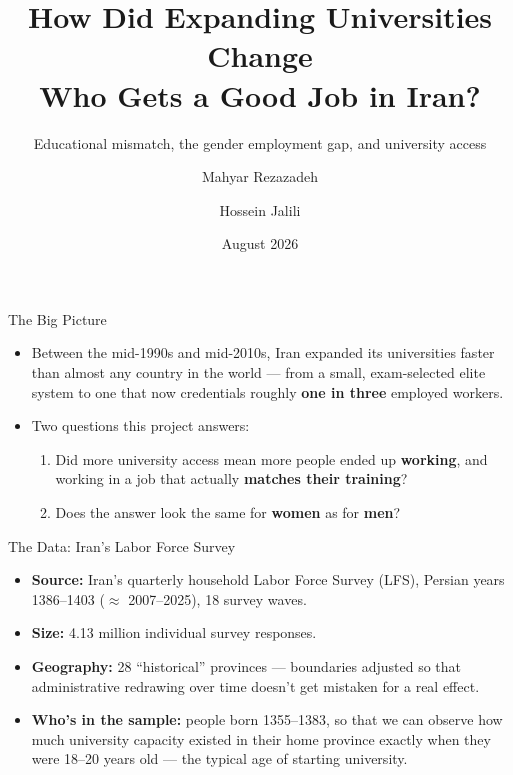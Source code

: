 \documentclass[aspectratio=169,11pt]{beamer}
\title{How Did Expanding Universities Change\\ Who Gets a Good Job in Iran?}
\subtitle{Educational mismatch, the gender employment gap, and university access}
\author{Mahyar Rezazadeh \and Hossein Jalili}
\date{August 2026}
\begin{document}
\begin{frame}
\titlepage
\end{frame}

\begin{frame}[c]{The Big Picture}
\begin{itemize}
\item Between the mid-1990s and mid-2010s, Iran expanded its universities faster than almost any country in the world --- from a small, exam-selected elite system to one that now credentials roughly \textbf{one in three} employed workers.
\medskip
\item Two questions this project answers:
\begin{enumerate}
\item Did more university access mean more people ended up \textbf{working}, and working in a job that actually \textbf{matches their training}?
\item Does the answer look the same for \textbf{women} as for \textbf{men}?
\end{enumerate}
\end{itemize}
\end{frame}

\begin{frame}[c]{The Data: Iran's Labor Force Survey}
\begin{itemize}
\item \textbf{Source:} Iran's quarterly household Labor Force Survey (LFS), Persian years 1386--1403 ($\approx$ 2007--2025), 18 survey waves.
\medskip
\item \textbf{Size:} 4.13 million individual survey responses.
\medskip
\item \textbf{Geography:} 28 ``historical'' provinces --- boundaries adjusted so that administrative redrawing over time doesn't get mistaken for a real effect.
\medskip
\item \textbf{Who's in the sample:} people born 1355--1383, so that we can observe how much university capacity existed in their home province exactly when they were 18--20 years old --- the typical age of starting university.
\end{itemize}
\end{frame}
\end{document}
